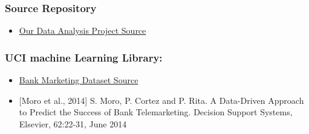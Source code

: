 \documentclass[
]{article}
\providecommand{\tightlist}{%
  \setlength{\itemsep}{0pt}\setlength{\parskip}{0pt}}
\begin{document}
\hypertarget{source-repository}{%
\subsubsection{Source Repository}\label{source-repository}}

\begin{itemize}
\tightlist
\item
  \href{https://github.com/smvijaykumar/stat420-group-project}{Our Data
  Analysis Project Source}
\end{itemize}

\hypertarget{uci-machine-learning-library}{%
\subsubsection{UCI machine Learning
Library:}\label{uci-machine-learning-library}}

\begin{itemize}
\item
  \href{http://archive.ics.uci.edu/ml/datasets/Bank+Marketing}{Bank
  Marketing Dataset Source}
\item
  {[}Moro et al., 2014{]} S. Moro, P. Cortez and P. Rita. A Data-Driven
  Approach to Predict the Success of Bank Telemarketing. Decision
  Support Systems, Elsevier, 62:22-31, June 2014
\end{itemize}
\end{document}
